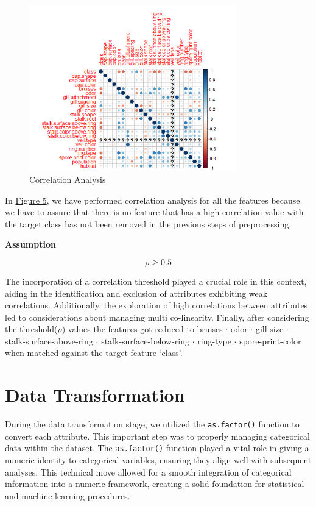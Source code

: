 \documentclass{article}
\begin{document}
\begin{figure}[ht]
    \centering
    \includegraphics[width=0.8\textwidth]{./images/Correlation_Plot.png}
    \caption{Correlation Analysis}
    \label{img:5}
\end{figure}

In \hyperref[img:5]{Figure 5}, we have performed correlation analysis for all the features because we have to assure that there is no feature that has a high correlation value with the target class has not been removed in the previous steps of preprocessing.

\textbf{Assumption}

\begin{equation}
    \rho \geq 0.5 
\end{equation}

The incorporation of a correlation threshold played a crucial role in this context, aiding in the identification and exclusion of attributes exhibiting weak correlations. Additionally, the exploration of high correlations between attributes led to considerations about managing multi co-linearity. Finally, after considering the threshold($\rho$) values the features got reduced to bruises $\cdot$ odor $\cdot$ gill-size $\cdot$ stalk-surface-above-ring $\cdot$ stalk-surface-below-ring $\cdot$ ring-type $\cdot$ spore-print-color when matched against the target feature `class'.

\section{Data Transformation}\label{sec:transfromation}
During the data transformation stage, we utilized the \texttt{as.factor()} function to convert each attribute. This important step was to properly managing categorical data within the dataset. The \texttt{as.factor()} function played a vital role in giving a numeric identity to categorical variables, ensuring they align well with subsequent analyses. This technical move allowed for a smooth integration of categorical information into a numeric framework, creating a solid foundation for statistical and machine learning procedures.
\end{document}
